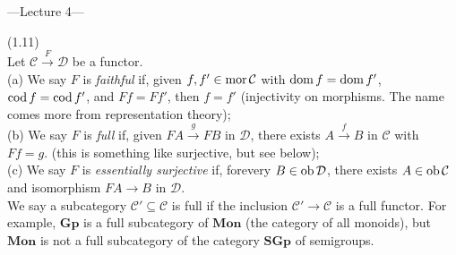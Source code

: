 \documentclass[a4paper]{article}
\begin{document}
---Lecture 4---

\begin{defi} (1.11)\\
    Let $\mathcal{C} \xrightarrow{F} \mathcal{D}$ be a functor.\\
    (a) We say $F$ is \emph{faithful} if, given $f,f' \in \operatorname{mor} \mathcal{C}$ with $\operatorname{dom} f = \operatorname{dom} f'$, $\operatorname{cod} f = \operatorname{cod} f'$, and $Ff = Ff'$, then $f=f'$ (injectivity on morphisms. The name comes more from representation theory);\\
    (b) We say $F$ is \emph{full} if, given $FA \xrightarrow{g} FB$ in $\mathcal{D}$, there exists $A \xrightarrow{f} B$ in $\mathcal{C}$ with $Ff = g$. (this is something like surjective, but see below);\\
    (c) We say  $F$ is \emph{essentially surjective} if, forevery $B \in \operatorname{ob} \mathcal{D}$, there exists $A \in \operatorname{ob} \mathcal{C}$ and isomorphism $FA \to B$ in $\mathcal{D}$.\\
    We say a subcategory $\mathcal{C}' \subseteq \mathcal{C}$ is full if the inclusion $\mathcal{C}' \to \mathcal{C}$ is a full functor. For example, $\mathbf{Gp}$ is a full subcategory of $\mathbf{Mon}$ (the category of all monoids), but $\mathbf{Mon}$ is not a full subcategory of the category $\mathbf{SGp}$ of semigroups.
\end{defi}
\end{document}
